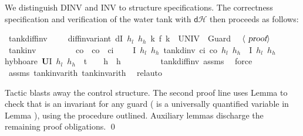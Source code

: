 \documentclass[envcountsame,envcountsect]{llncs}
\newcommand{\dH}{\mathsf{d}\mathcal{H}}
\newcommand{\isactrlU}{\textbf{\textsf{U}}}
\begin{document}
\begin{example}
\noindent We distinguish DINV and INV to structure specifications. The correctness specification
and verification of the water tank with $\dH$ then proceeds as follows:

\begin{isabellebody}
\isanewline
{}\isamarkupfalse%
\ tank{\isacharunderscore}diff{\isacharunderscore}inv{\isacharcolon}\ {\isachardoublequoteopen}{}\ {\isasymle}\ {\isasymtau}\ {\isasymLongrightarrow}\ diff{\isacharunderscore}invariant\ {\isacharparenleft}dI\ $h_l$\ $h_h$\ k{\isacharparenright}\ {\isacharparenleft}f\ k{\isacharparenright}\ {\isacharbraceleft}{}{\isachardot}{\isachardot}{\isasymtau}{\isacharbraceright}\ UNIV\ {}\ Guard{\isachardoublequoteclose}\isanewline
\ \ $\langle \isa{proof}\rangle$\isanewline
\isanewline
{}\isamarkupfalse%
\ tank{\isacharunderscore}inv{\isacharcolon}\isanewline
\ \ \ {\isachardoublequoteopen}{}\ {\isasymle}\ {\isasymtau}{\isachardoublequoteclose}\ \ {\isachardoublequoteopen}{}\ {\isacharless}\ c\isactrlsub o{\isachardoublequoteclose}\ \ {\isachardoublequoteopen}c\isactrlsub o\ {\isacharless}\ c\isactrlsub i{\isachardoublequoteclose}\isanewline
\ \ \ {\isachardoublequoteopen}\ \isactrlbold {\isacharbraceleft}I\ $h_l$\ $h_h$\isactrlbold {\isacharbraceright}\ tank{\isacharunderscore}dinv\ c\isactrlsub i\ c\isactrlsub o\ $h_l$\ $h_h$\ {\isasymtau}\ \isactrlbold {\isacharbraceleft}I\ $h_l$\ $h_h$\isactrlbold {\isacharbraceright}{\isachardoublequoteclose}\isanewline
\ \ \isamarkupfalse%
{\isacharparenleft}hyb{\isacharunderscore}hoare\ {\isachardoublequoteopen}{\isactrlU}{\isacharparenleft}I\ $h_l$\ $h_h$\ {\isasymand}\ t\ {\isacharequal}\ {}\ {\isasymand}\ h\ {\isacharequal}\ h{\isacharparenright}{\isachardoublequoteclose}{\isacharparenright}\isanewline
\ \ \isamarkupfalse%
\ {}\ \isamarkupfalse%
\ {}\ \isamarkupfalse%
\ tank{\isacharunderscore}diff{\isacharunderscore}inv\ assms\ \isamarkupfalse%
\ force{\isacharplus}\isanewline
\ \ \isamarkupfalse%
\ assms\ tank{\isacharunderscore}inv{\isacharunderscore}arith{}\ tank{\isacharunderscore}inv{\isacharunderscore}arith{}\ \isamarkupfalse%
\ rel{\isacharunderscore}auto{\isacharprime}\isanewline
\end{isabellebody}

\noindent Tactic  blasts away the control structure. The second proof
line uses Lemma  to check that  is an
invariant for any guard ( is a universally
quantified variable in Lemma ), using the procedure
outlined. Auxiliary lemmas discharge the remaining
proof obligations.  \qed
\end{example}
\end{document}
